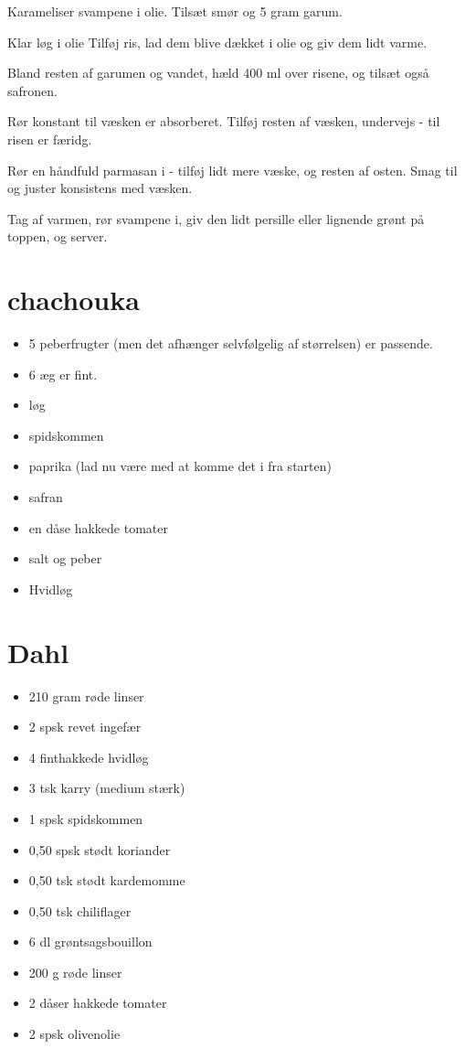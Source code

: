 \documentclass[
]{book}
\providecommand{\tightlist}{%
  \setlength{\itemsep}{0pt}\setlength{\parskip}{0pt}}
\begin{document}
Karameliser svampene i olie.
Tilsæt smør og 5 gram garum.

Klar løg i olie
Tilføj ris, lad dem blive dækket i olie og giv dem lidt varme.

Bland resten af garumen og vandet, hæld 400 ml over risene, og
tilsæt også safronen.

Rør konstant til væsken er absorberet. Tilføj resten af
væsken, undervejs - til risen er færidg.

Rør en håndfuld parmasan i - tilføj lidt mere væske, og
resten af osten. Smag til og juster konsistens med væsken.

Tag af varmen, rør svampene i, giv den lidt persille eller lignende
grønt på toppen, og server.

\hypertarget{chachouka}{%
\section{chachouka}\label{chachouka}}

\begin{itemize}
\tightlist
\item
  5 peberfrugter (men det afhænger selvfølgelig af størrelsen) er passende.
\item
  6 æg er fint.
\item
  løg
\item
  spidskommen
\item
  paprika (lad nu være med at komme det i fra starten)
\item
  safran
\item
  en dåse hakkede tomater
\item
  salt og peber
\item
  Hvidløg
\end{itemize}

\hypertarget{dahl}{%
\section{Dahl}\label{dahl}}

\begin{itemize}
\tightlist
\item
  210 gram røde linser
\item
  2 spsk revet ingefær
\item
  4 finthakkede hvidløg
\item
  3 tsk karry (medium stærk)
\item
  1 spsk spidskommen
\item
  0,50 spsk stødt koriander
\item
  0,50 tsk stødt kardemomme
\item
  0,50 tsk chiliflager
\item
  6 dl grøntsagsbouillon
\item
  200 g røde linser
\item
  2 dåser hakkede tomater
\item
  2 spsk olivenolie
\end{itemize}
\end{document}

